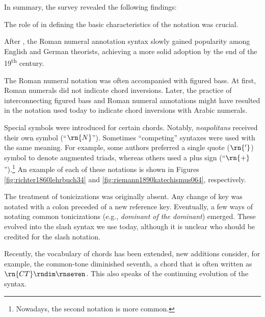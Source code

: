 In summary, the survey revealed the following findings:

The role of \textcite{weber1817versuch} in defining the
basic characteristics of the notation was crucial.


After \textcite{weber1817versuch}, the Roman numeral
annotation syntax slowly gained popularity among English and
German theorists, achieving a more solid adoption by the end
of the 19\textsuperscript{th} century.

 The Roman numeral notation was often accompanied with
figured bass. At first, Roman numerals did not indicate
chord inversions. Later, the practice of interconnecting
figured bass and Roman numeral annotations might have
resulted in the notation used today to indicate chord
inversions with Arabic numerals.

Special symbols were introduced for certain chords. Notably,
\emph{neapolitans} received their own symbol (``$\rn{N}$'').
Sometimes ``competing'' syntaxes were used with the same
meaning. For example, some authors preferred a single quote
($\rn{'}$) symbol to denote augmented triads, whereas others
used a plus sign (``$\rn{+}$'').\footnote{Nowadays, the
second notation is more common.} An example of each of these
notations is shown in Figures
\ref{fig:richter1860lehrbuch34} and
\ref{fig:riemann1890katechismus064}, respectively.

The treatment of tonicizations was originally absent. Any
change of key was notated with a colon preceded of a new
reference key. Eventually, a few ways of notating common
tonicizations (e.g., \emph{dominant of the dominant})
emerged. These evolved into the slash syntax we use today,
although it is unclear who should be credited for the slash
notation.

Recently, the vocabulary of chords has been extended, new
additions consider, for example, the common-tone diminished
seventh, a chord that is often written as
$\rn{CT}\rndim\rnseven$. This also speaks of the continuing
evolution of the syntax.
